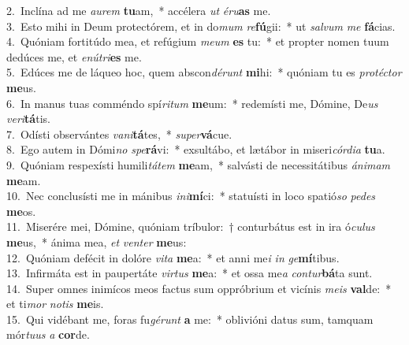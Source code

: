 {2.~}Inclína ad me \textit{au}\textit{rem} \textbf{tu}am,~* accélera \textit{ut} \textit{é}\textit{ru}\textbf{as} me.\\
{3.~}Esto mihi in Deum protectórem, et in do\textit{mum} \textit{re}\textbf{fú}gii:~* ut \textit{sal}\textit{vum} \textit{me} \textbf{fá}cias.\\
{4.~}Quóniam fortitúdo mea, et refúgium \textit{me}\textit{um} \textbf{es} tu:~* et propter nomen tuum dedúces me, et \textit{e}\textit{nú}\textit{tri}\textbf{es} me.\\
{5.~}Edúces me de láqueo hoc, quem abscon\textit{dé}\textit{runt} \textbf{mi}hi:~* quóniam tu es \textit{pro}\textit{té}\textit{ctor} \textbf{me}us.\\
{6.~}In manus tuas comméndo spí\textit{ri}\textit{tum} \textbf{me}um:~* redemísti me, Dómine, De\textit{us} \textit{ve}\textit{ri}\textbf{tá}tis.\\
{7.~}Odísti observántes \textit{va}\textit{ni}\textbf{tá}tes,~* \textit{su}\textit{per}\textbf{vá}cue.\\
{8.~}Ego autem in Dómi\textit{no} \textit{spe}\textbf{rá}vi:~* exsultábo, et lætábor in miseri\textit{cór}\textit{di}\textit{a} \textbf{tu}a.\\
{9.~}Quóniam respexísti humili\textit{tá}\textit{tem} \textbf{me}am,~* salvásti de necessitátibus \textit{á}\textit{ni}\textit{mam} \textbf{me}am.\\
{10.~}Nec conclusísti me in mánibus \textit{i}\textit{ni}\textbf{mí}ci:~* statuísti in loco spatió\textit{so} \textit{pe}\textit{des} \textbf{me}os.\\
{11.~}Miserére mei, Dómine, quóniam tríbulor:~† conturbátus est in ira ó\textit{cu}\textit{lus} \textbf{me}us,~* ánima mea, \textit{et} \textit{ven}\textit{ter} \textbf{me}us:\\
{12.~}Quóniam defécit in dolóre \textit{vi}\textit{ta} \textbf{me}a:~* et anni me\textit{i} \textit{in} \textit{ge}\textbf{mí}tibus.\\
{13.~}Infirmáta est in paupertáte \textit{vir}\textit{tus} \textbf{me}a:~* et ossa me\textit{a} \textit{con}\textit{tur}\textbf{bá}ta sunt.\\
{14.~}Super omnes inimícos meos factus sum oppróbrium et vicínis \textit{me}\textit{is} \textbf{val}de:~* et ti\textit{mor} \textit{no}\textit{tis} \textbf{me}is.\\
{15.~}Qui vidébant me, foras fu\textit{gé}\textit{runt} \textbf{a} me:~* oblivióni datus sum, tamquam mór\textit{tu}\textit{us} \textit{a} \textbf{cor}de.\\
